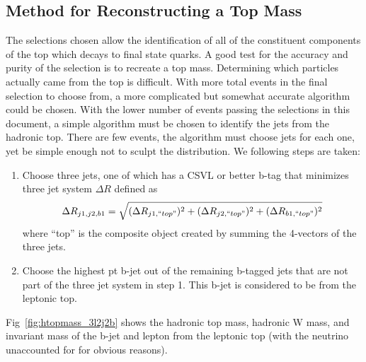 	\subsection{Method for Reconstructing a Top Mass}
	The selections chosen allow the identification of all of the constituent components of the top which decays to final state quarks. A good test for the accuracy and purity of the selection is to recreate a top mass. Determining which  particles actually came from the top is difficult. With more total events in the final selection to choose from, a more complicated but somewhat accurate algorithm could be chosen. With the lower number of events passing the selections in this document, a simple algorithm must be chosen to identify the jets from the hadronic top. There are few events, the algorithm must choose jets for each one, yet be simple enough not to sculpt the distribution. We following steps are taken:
\begin{enumerate}
\item Choose three jets, one of which has a CSVL or better b-tag that minimizes three jet system $\Delta R$ defined as
\begin{equation}
\Delta R_{j1,j2,b1} = \sqrt{ (\Delta R_{j1, ``top"}) ^2 + (\Delta R_{j2, ``top"}) ^2 + (\Delta R_{b1, ``top"}) ^2 }
\end{equation}
where ``top'' is the composite object created by summing the 4-vectors of the three jets.
\item Choose the highest pt b-jet out of the remaining b-tagged jets that are not part of the three jet system in step 1. This b-jet is considered to be from the leptonic top.
\end{enumerate}

Fig~\ref{fig:htopmass_3l2j2b} shows the hadronic top mass, hadronic W mass, and invariant mass of the b-jet and lepton from the leptonic top (with the neutrino unaccounted for for obvious reasons).


